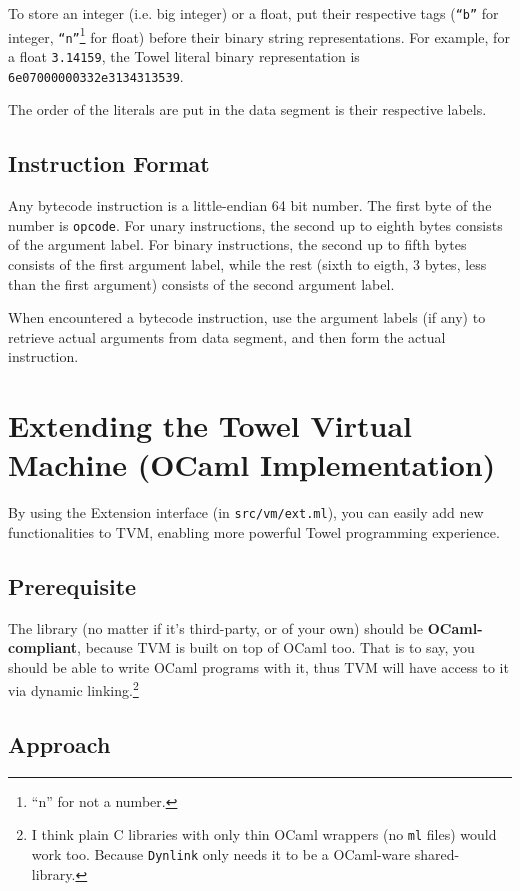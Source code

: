 \documentclass{article}
\begin{document}
To store an integer (i.e. big integer) or a float, put their respective tags (\texttt{``b''} for integer, \texttt{``n''}\footnote{``n'' for not a number.} for float) before their binary string representations. For example, for a float \texttt{3.14159}, the Towel literal binary representation is \texttt{6e07000000332e3134313539}.

The order of the literals are put in the data segment is their respective labels.

\subsection{Instruction Format}

Any bytecode instruction is a little-endian 64 bit number. The first byte of the number is \texttt{opcode}. For unary instructions, the second up to eighth bytes consists of the argument label. For binary instructions, the second up to fifth bytes consists of the first argument label, while the rest (sixth to eigth, 3 bytes, less than the first argument) consists of the second argument label.

When encountered a bytecode instruction, use the argument labels (if any) to retrieve actual arguments from data segment, and then form the actual instruction.

\section{Extending the Towel Virtual Machine (OCaml Implementation)}

By using the Extension interface (in \texttt{src/vm/ext.ml}), you can easily add new functionalities to TVM, enabling more powerful Towel programming experience.

\subsection{Prerequisite}

The library (no matter if it's third-party, or of your own) should be \textbf{OCaml-compliant}, because TVM is built on top of OCaml too. That is to say, you should be able to write OCaml programs with it, thus TVM will have access to it via dynamic linking.\footnote{I think plain C libraries with only thin OCaml wrappers (no \texttt{ml} files) would work too. Because \texttt{Dynlink} only needs it to be a OCaml-ware shared-library.}

\subsection{Approach}
\end{document}
